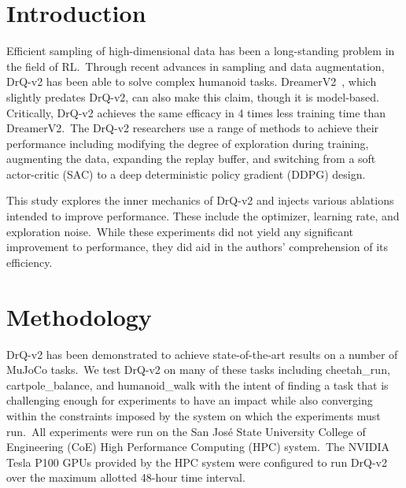 \documentclass[conference]{./IEEEtran/IEEEtran} %
\begin{document}
    \section{Introduction}\label{sec:introduction}
    Efficient sampling of high-dimensional data has been a long-standing problem in the field of RL.\ Through recent
    advances in sampling and data augmentation, DrQ-v2 has been able to solve complex humanoid tasks.
    DreamerV2~\cite{DreamerV2}, which slightly predates DrQ-v2, can also make this claim, though it is model-based.
    Critically, DrQ-v2 achieves the same efficacy in 4 times less training time than DreamerV2.\ The DrQ-v2 researchers
    use a range of methods to achieve their performance including modifying the degree of exploration during training,
    augmenting the data, expanding the replay buffer, and switching from a soft actor-critic (SAC) to a deep
    deterministic policy gradient (DDPG) design.


    This study explores the inner mechanics of DrQ-v2 and injects various ablations intended to improve performance.
    These include the optimizer, learning rate, and exploration noise.\ While these experiments did not yield any
    significant improvement to performance, they did aid in the authors' comprehension of its efficiency.

    \section{Methodology}\label{sec:methodology}
    DrQ-v2 has been demonstrated to achieve state-of-the-art results on a number of MuJoCo tasks.\ We test DrQ-v2 on
    many of these tasks including cheetah\_run, cartpole\_balance, and humanoid\_walk with the intent of finding a
    task that is challenging enough for experiments to have an impact while also converging within the constraints
    imposed by the system on which the experiments must run.\ All experiments were run on the San Jos\'e State
    University College of Engineering (CoE) High Performance Computing (HPC) system.\ The NVIDIA Tesla P100 GPUs
    provided by the HPC system were configured to run DrQ-v2 over the maximum allotted 48-hour time interval.
\end{document}
